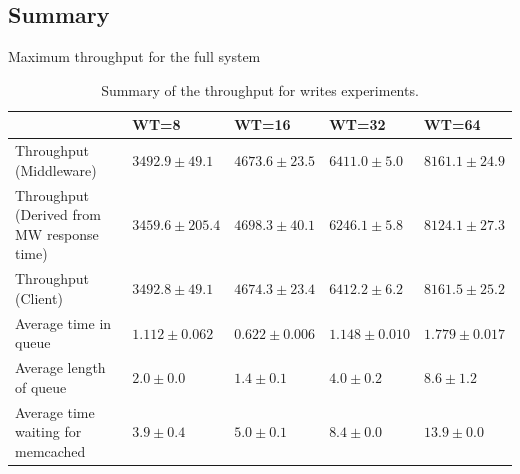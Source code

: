 \documentclass[11pt,a4paper]{article}
\begin{document}
\subsection{Summary} \label{sec:tpfw-summary}

\begin{table}[h]
\small
\centering
{Maximum throughput for the full system}
\begin{tabular}{|p{5.1cm}|p{2.1cm}|p{1.9cm}|p{1.9cm}|p{1.9cm}|}
\hline                                            & WT=8               & WT=16             & WT=32             & WT=64             \\ 
\hline Throughput (Middleware)                    & $3492.9 \pm 49.1$  & $4673.6 \pm 23.5$ & $6411.0 \pm 5.0$  & $8161.1 \pm 24.9$  \\ 
\hline Throughput (Derived from MW response time) & $3459.6 \pm 205.4$ & $4698.3 \pm 40.1$ & $6246.1 \pm 5.8$  & $8124.1 \pm 27.3$ \\ 
\hline Throughput (Client)                        & $3492.8 \pm 49.1$  & $4674.3 \pm 23.4$ & $6412.2 \pm 6.2$  & $8161.5 \pm 25.2$ \\ 
\hline Average time in queue                      & $1.112 \pm 0.062$  & $0.622 \pm 0.006$ & $1.148 \pm 0.010$ & $1.779 \pm 0.017$ \\ 
\hline Average length of queue                    & $2.0 \pm 0.0$      & $1.4 \pm 0.1$     & $4.0 \pm 0.2$     & $8.6 \pm 1.2$     \\ 
\hline Average time waiting for memcached         & $3.9 \pm 0.4$      & $5.0 \pm 0.1$     & $8.4 \pm 0.0$     & $13.9 \pm 0.0$    \\ 
\hline 
\end{tabular}
\caption{Summary of the throughput for writes experiments.} \label{tab:tpfw-summary}
\end{table}
\end{document}
